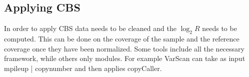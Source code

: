 	\subsection{Applying CBS}
	In order to apply CBS data needs to be cleaned and the $\log_2 R$ needs to be computed.
	This can be done on the coverage of the sample and the reference coverage once they have been normalized.
	Some tools include all the necessary framework, while others only modules.
	For example VarScan can take as input mpileup | copynumber and then applies copyCaller.
